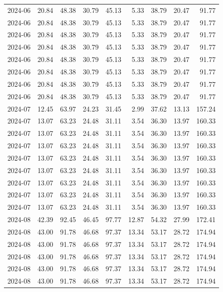 \begin{table}[ht]
\begin{tabular}{lrrrrrrrr}
  2024-06 & 20.84 & 48.38 & 30.79 & 45.13 & 5.33 & 38.79 & 20.47 & 91.77 \\ 
  2024-06 & 20.84 & 48.38 & 30.79 & 45.13 & 5.33 & 38.79 & 20.47 & 91.77 \\ 
  2024-06 & 20.84 & 48.38 & 30.79 & 45.13 & 5.33 & 38.79 & 20.47 & 91.77 \\ 
  2024-06 & 20.84 & 48.38 & 30.79 & 45.13 & 5.33 & 38.79 & 20.47 & 91.77 \\ 
  2024-06 & 20.84 & 48.38 & 30.79 & 45.13 & 5.33 & 38.79 & 20.47 & 91.77 \\ 
  2024-06 & 20.84 & 48.38 & 30.79 & 45.13 & 5.33 & 38.79 & 20.47 & 91.77 \\ 
  2024-06 & 20.84 & 48.38 & 30.79 & 45.13 & 5.33 & 38.79 & 20.47 & 91.77 \\ 
  2024-06 & 20.84 & 48.38 & 30.79 & 45.13 & 5.33 & 38.79 & 20.47 & 91.77 \\ 
  2024-07 & 12.45 & 63.97 & 24.23 & 31.45 & 2.99 & 37.62 & 13.13 & 157.24 \\ 
  2024-07 & 13.07 & 63.23 & 24.48 & 31.11 & 3.54 & 36.30 & 13.97 & 160.33 \\ 
  2024-07 & 13.07 & 63.23 & 24.48 & 31.11 & 3.54 & 36.30 & 13.97 & 160.33 \\ 
  2024-07 & 13.07 & 63.23 & 24.48 & 31.11 & 3.54 & 36.30 & 13.97 & 160.33 \\ 
  2024-07 & 13.07 & 63.23 & 24.48 & 31.11 & 3.54 & 36.30 & 13.97 & 160.33 \\ 
  2024-07 & 13.07 & 63.23 & 24.48 & 31.11 & 3.54 & 36.30 & 13.97 & 160.33 \\ 
  2024-07 & 13.07 & 63.23 & 24.48 & 31.11 & 3.54 & 36.30 & 13.97 & 160.33 \\ 
  2024-07 & 13.07 & 63.23 & 24.48 & 31.11 & 3.54 & 36.30 & 13.97 & 160.33 \\ 
  2024-07 & 13.07 & 63.23 & 24.48 & 31.11 & 3.54 & 36.30 & 13.97 & 160.33 \\ 
  2024-08 & 42.39 & 92.45 & 46.45 & 97.77 & 12.87 & 54.32 & 27.99 & 172.41 \\ 
  2024-08 & 43.00 & 91.78 & 46.68 & 97.37 & 13.34 & 53.17 & 28.72 & 174.94 \\ 
  2024-08 & 43.00 & 91.78 & 46.68 & 97.37 & 13.34 & 53.17 & 28.72 & 174.94 \\ 
  2024-08 & 43.00 & 91.78 & 46.68 & 97.37 & 13.34 & 53.17 & 28.72 & 174.94 \\ 
  2024-08 & 43.00 & 91.78 & 46.68 & 97.37 & 13.34 & 53.17 & 28.72 & 174.94 \\ 
  2024-08 & 43.00 & 91.78 & 46.68 & 97.37 & 13.34 & 53.17 & 28.72 & 174.94 \\ 

\end{tabular}
\end{table}
